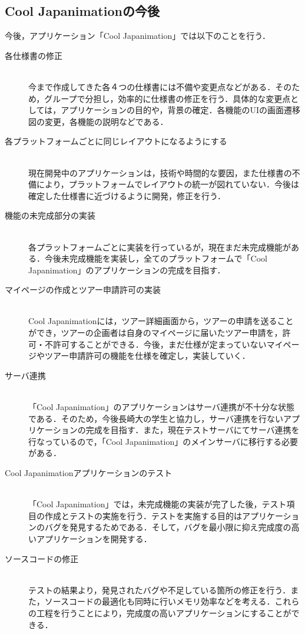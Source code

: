 \subsection{Cool Japanimationの今後}
\par
今後，アプリケーション「Cool Japanimation」では以下のことを行う．
\begin{description}
\item[各仕様書の修正]\mbox{}\\
今まで作成してきた各４つの仕様書には不備や変更点などがある．そのため，グループで分担し，効率的に仕様書の修正を行う．具体的な変更点としては，アプリケーションの目的や，背景の確定．各機能のUIの画面遷移図の変更，各機能の説明などである．
\item[各プラットフォームごとに同じレイアウトになるようにする]\mbox{}\\
現在開発中のアプリケーションは，技術や時間的な要因，また仕様書の不備により，プラットフォームでレイアウトの統一が図れていない．今後は確定した仕様書に近づけるように開発，修正を行う．
\item[機能の未完成部分の実装]\mbox{}\\
各プラットフォームごとに実装を行っているが，現在まだ未完成機能がある．今後未完成機能を実装し，全てのプラットフォームで「Cool Japanimation」のアプリケーションの完成を目指す．
\item[マイページの作成とツアー申請許可の実装]\mbox{}\\
Cool Japanimationには，ツアー詳細画面から，ツアーの申請を送ることができ，ツアーの企画者は自身のマイページに届いたツアー申請を，許可・不許可することができる．今後，まだ仕様が定まっていないマイページやツアー申請許可の機能を仕様を確定し，実装していく．
\item[サーバ連携]\mbox{}\\
「Cool Japanimation」のアプリケーションはサーバ連携が不十分な状態である．そのため，今後長崎大の学生と協力し，サーバ連携を行ないアプリケーションの完成を目指す．また，現在テストサーバにてサーバ連携を行なっているので，「Cool Japanimation」のメインサーバに移行する必要がある．
\item[Cool Japanimationアプリケーションのテスト]\mbox{}\\
「Cool Japanimation」では，未完成機能の実装が完了した後，テスト項目の作成とテストの実施を行う．テストを実施する目的はアプリケーションのバグを発見するためである．そして，バグを最小限に抑え完成度の高いアプリケーションを開発する．
\item[ソースコードの修正]\mbox{}\\
テストの結果より，発見されたバグや不足している箇所の修正を行う．また，ソースコードの最適化も同時に行いメモリ効率などを考える．これらの工程を行うことにより，完成度の高いアプリケーションにすることができる．

\end{description}
